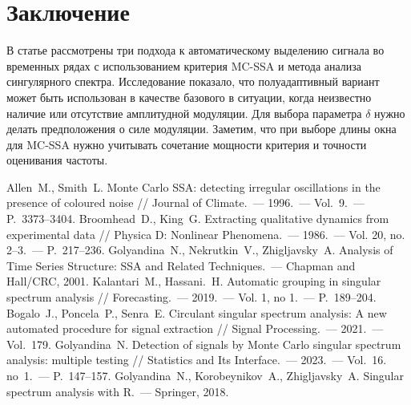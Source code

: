 \documentclass{math-mech-sci}
\begin{document}
\section*{Заключение}
В статье рассмотрены три подхода к автоматическому выделению сигнала во временных рядах с использованием критерия MC-SSA и метода анализа сингулярного спектра. 
Исследование показало, что полуадаптивный вариант может быть использован в качестве базового в ситуации, когда неизвестно наличие или отсутствие амплитудной модуляции. Для выбора параметра $\delta$ нужно делать предположения о силе модуляции. Заметим, что при выборе длины окна для MC-SSA нужно учитывать сочетание мощности критерия  и точности оценивания частоты.

\begin{thebibliography}{8}
     Allen~M., Smith~L. Monte Carlo SSA: detecting irregular oscillations in the presence of coloured noise // Journal of Climate.~--- 1996.~--- Vol.~9.~--- P.~3373--3404.
     Broomhead~D., King~G. Extracting qualitative dynamics from experimental data // Physica D: Nonlinear Phenomena.~--- 1986.~--- Vol. 20, no. 2–3.~--- P.~217--236.
     Golyandina~N., Nekrutkin~V., Zhigljavsky~A. Analysis of Time Series Structure: SSA and Related Techniques.~--- Chapman and Hall/CRC, 2001.
     Kalantari~M., Hassani.~H. Automatic grouping in singular spectrum analysis // Forecasting.~--- 2019.~--- Vol. 1, no 1.~--- P.~189--204.
     Bogalo~J., Poncela~P., Senra~E. Circulant singular spectrum analysis: A new automated procedure for signal extraction // Signal Processing.~--- 2021.~--- Vol.~179.
     Golyandina~N. Detection of signals by Monte Carlo singular spectrum analysis: multiple testing // Statistics and Its Interface.~--- 2023.~--- Vol.~16. no~1.~--- P.~147--157. 
     Golyandina~N., Korobeynikov~A., Zhigljavsky~A. Singular spectrum analysis with R.~--- Springer, 2018.
\end{thebibliography}
\end{document}
